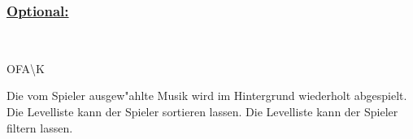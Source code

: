 %
%
\subsubsection*{\underline{Optional:}}~\\


\begin{ids}{\gls{OFA\K}}

	\id[ 360] Die vom Spieler ausgew{"a}hlte Musik wird im Hintergrund wiederholt abgespielt.
	\id[ 370] Die Levelliste kann der Spieler sortieren lassen.
	\id[ 380] Die Levelliste kann der Spieler filtern lassen.
	
 	
 	
	
\end{ids}

~\\